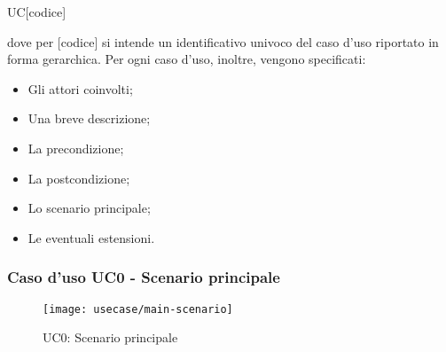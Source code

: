 \begin{center}
  UC[codice]
\end{center}

dove per [codice] si intende un identificativo univoco del caso d'uso riportato in forma gerarchica. Per ogni caso d'uso, inoltre, vengono specificati:
\begin{itemize}
  \item Gli attori coinvolti;
  \item Una breve descrizione;
  \item La precondizione;
  \item La postcondizione;
  \item Lo scenario principale;
  \item Le eventuali estensioni.
\end{itemize}

\subsubsection{Caso d'uso UC0 - Scenario principale}
\begin{figure}[!ht]
  \begin{center}
    \texttt{[image: usecase/main-scenario]}
    \caption{UC0: Scenario principale}
    \label{fig:uc0}
  \end{center}
\end{figure}

